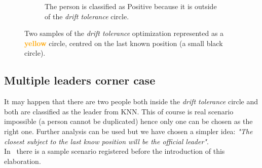 \begin{figure}[!h]
\begin{subfigure}[!h]{0.39\textwidth}
		\caption{The person is classified as Positive because it is outside of the \textit{drift tolerance} circle.}
		\label{fig:driftOptimizationOk}
	\end{subfigure}
	\captionsetup{margin=1.4cm}
	\caption[Two samples of the \textit{drift tolerance} optimization.]{Two samples of the \textit{drift tolerance} optimization represented as a \textbf{\textcolor{orange}{yellow}} circle, centred on the last known position (a small black circle).}
	\label{fig:driftOptimization}
\end{figure}

\subsection{Multiple leaders corner case} \label{sec:multipleleaders}
It may happen that there are two people both inside the \textit{drift tolerance} circle and both are classified as the leader from KNN. This of course is real scenario impossible (a person cannot be duplicated) hence only one can be chosen as the right one. Further analysis can be used but we have chosen a simpler idea: \textit{"The closest subject to the last know position will be the official leader"}.\\
In~ there is a sample scenario registered before the introduction of this elaboration.
